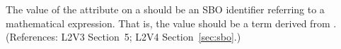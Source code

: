 The value of the  attribute on a \Trigger should be an SBO
identifier referring to a mathematical expression.  That is, the value
should be a term derived from \sbomathformula.  (References: 
L2V3 Section~5; L2V4 Section~\ref{sec:sbo}.)
